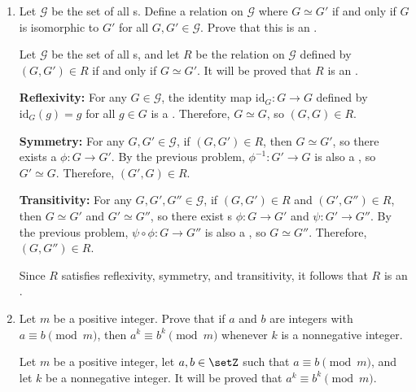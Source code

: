 \begin{enumerate}
\begin{subprove}
    Let \(g_{1}, g_{2} \in G\).
    Since \(\phi\) preserves the operation, \(\phi(g_{1} * g_{2}) = \phi(g_{1}) \circ \phi(g_{2})\), where \(\circ\) is the operation on \(H\).
    Since \(\psi\) preserves the operation, \(\psi(\phi(g_{1}) \circ \phi(g_{2})) = \psi(\phi(g_{1})) \star \psi(\phi(g_{2}))\).
    Therefore, \((\psi \circ \phi)(g_{1} * g_{2}) = \psi(\phi(g_{1} * g_{2})) = \psi(\phi(g_{1}) \circ \phi(g_{2})) = \psi(\phi(g_{1})) \star \psi(\phi(g_{2})) = (\psi \circ \phi)(g_{1}) \star (\psi \circ \phi)(g_{2})\).
    
    Therefore, \(\psi \circ \phi\) is a .
  \end{subprove}
  \item Let \(\mathcal{G}\) be the set of all s.
  Define a relation on \(\mathcal{G}\) where \(G \simeq G'\) if and only if \(G\) is isomorphic to \(G'\) for all \(G, G' \in \mathcal{G}\).
  Prove that this is an .
  \begin{subprove}
    Let \(\mathcal{G}\) be the set of all s, and let \(R\) be the relation on \(\mathcal{G}\) defined by \((G, G') \in R\) if and only if \(G \simeq G'\).
    It will be proved that \(R\) is an .
    
    \textbf{Reflexivity:} For any \(G \in \mathcal{G}\), the identity map \(\text{id}_{G}: G \to G\) defined by \(\text{id}_{G}(g) = g\) for all \(g \in G\) is a .
    Therefore, \(G \simeq G\), so \((G, G) \in R\).
    
    \textbf{Symmetry:} For any \(G, G' \in \mathcal{G}\), if \((G, G') \in R\), then \(G \simeq G'\), so there exists a  \(\phi: G \to G'\).
    By the previous problem, \(\phi^{-1}: G' \to G\) is also a , so \(G' \simeq G\).
    Therefore, \((G', G) \in R\).
    
    \textbf{Transitivity:} For any \(G, G', G'' \in \mathcal{G}\), if \((G, G') \in R\) and \((G', G'') \in R\), then \(G \simeq G'\) and \(G' \simeq G''\), so there exist s \(\phi: G \to G'\) and \(\psi: G' \to G''\).
    By the previous problem, \(\psi \circ \phi: G \to G''\) is also a , so \(G \simeq G''\).
    Therefore, \((G, G'') \in R\).
    
    Since \(R\) satisfies reflexivity, symmetry, and transitivity, it follows that \(R\) is an .
  \end{subprove}
  \item Let \(m\) be a positive integer.
  Prove that if \(a\) and \(b\) are integers with \(a \equiv b \pmod{m}\), then \(a^{k} \equiv b^{k} \pmod{m}\) whenever \(k\) is a nonnegative integer.
  \begin{subprove}
    Let \(m\) be a positive integer, let \(a, b \in \setZ\) such that \(a \equiv b \pmod{m}\), and let \(k\) be a nonnegative integer.
    It will be proved that \(a^{k} \equiv b^{k} \pmod{m}\).
    

\end{subprove}
\end{enumerate}
